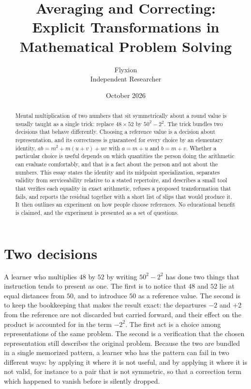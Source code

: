 \documentclass[11pt]{article}
\title{Averaging and Correcting:\\Explicit Transformations in Mathematical Problem Solving}
\author{Flyxion\\\small Independent Researcher}
\date{October 2026}
\theoremstyle{definition}
\theoremstyle{remark}
\begin{document}
\maketitle

\begin{abstract}
\noindent
Mental multiplication of two numbers that sit symmetrically about a round value is usually taught as a single trick: replace $48\times 52$ by $50^2-2^2$. The trick bundles two decisions that behave differently. Choosing a reference value is a decision about representation, and its correctness is guaranteed for every choice by an elementary identity, $ab=m^2+m(u+v)+uv$ with $a=m+u$ and $b=m+v$. Whether a particular choice is useful depends on which quantities the person doing the arithmetic can evaluate comfortably, and that is a fact about the person and not about the numbers. This essay states the identity and its midpoint specialization, separates validity from serviceability relative to a stated repertoire, and describes a small tool that verifies each equality in exact arithmetic, refuses a proposed transformation that fails, and reports the residual together with a short list of slips that would produce it. It then outlines an experiment on how people choose references. No educational benefit is claimed, and the experiment is presented as a set of questions.
\end{abstract}

\section{Two decisions}

A learner who multiplies $48$ by $52$ by writing $50^2-2^2$ has done two things that instruction tends to present as one. The first is to notice that $48$ and $52$ lie at equal distances from $50$, and to introduce $50$ as a reference value. The second is to keep the bookkeeping that makes the result exact: the departures $-2$ and $+2$ from the reference are not discarded but carried forward, and their effect on the product is accounted for in the term $-2^2$. The first act is a choice among representations of the same problem. The second is a verification that the chosen representation still describes the original problem. Because the two are bundled in a single memorized pattern, a learner who has the pattern can fail in two different ways: by applying it where it is not useful, and by applying it where it is not valid, for instance to a pair that is not symmetric, so that a correction term which happened to vanish before is silently dropped.
\end{document}
